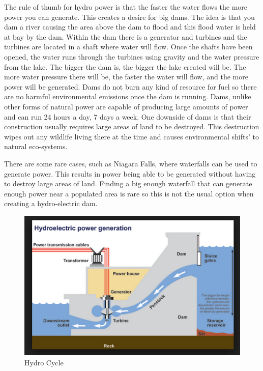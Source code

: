 \documentclass[msc,oneside]{ubcthesis}%
\begin{document}
The rule of thumb for hydro power is that the faster the water flows the more power you can generate. This 
creates a desire for big dams. The idea is that you dam a river causing the area above the dam 
to flood and this flood water is held at bay by the dam. Within the dam there is a generator and turbines and the turbines are located in a shaft where water will flow. Once the shafts have been opened, the water runs through the turbines using gravity and the water pressure from the lake. The bigger the dam is, the bigger the lake created will be. The more water pressure there will be, the faster the water will flow, and the more power will be generated. 
 Dams do not burn any kind of resource for fuel so there are no harmful environmental emissions once the dam is running. Dams, unlike other forms of natural power are capable of producing large amounts of power and can run 24 hours a day, 7 days a week. One downside of dams is that their construction usually requires large areas of land to be destroyed. This destruction wipes out any wildlife living there at the time and causes environmental shifts' to natural eco-systems. 

There are some rare cases, such as Niagara Falls, where waterfalls can be used to generate power. This results in power being able to be generated without having to destroy large areas of land. Finding a big enough waterfall that can generate enough power near a populated area is rare so this is not the usual option when creating a hydro-electric dam. 

\begin{figure}[hbt]\label{hydroCycle}
  \begin{center}
    \includegraphics[width=1\textwidth]{hydro}
    \caption[Hydro Cycle]{Hydro Cycle \cite{Hydro}}
  \end{center}
\end{figure}
\end{document}

